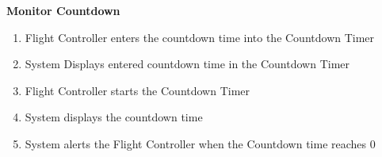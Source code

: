 \documentclass[letterpaper]{article}
\begin{document}
\noindent
\textbf{Monitor Countdown}
\begin{enumerate}
\item Flight Controller enters the countdown time into the Countdown
Timer
\item System Displays entered countdown time in the Countdown Timer
\item Flight Controller starts the Countdown Timer
\item System displays the countdown time
\item System alerts the Flight Controller when the Countdown time
reaches 0
\end{enumerate}
\end{document}
